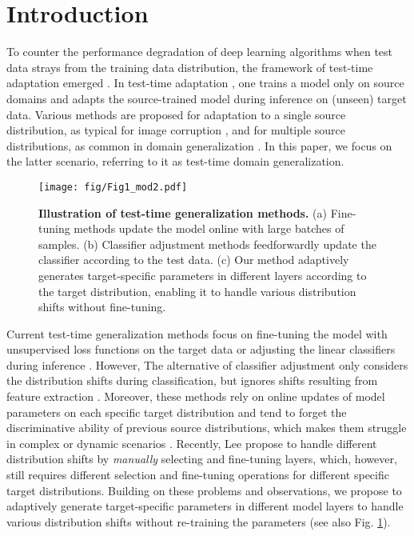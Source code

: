 \section{Introduction}

To counter the performance degradation of deep learning algorithms when test data strays from the training data distribution, the framework of test-time adaptation emerged \cite{wang2021tent, iwasawa2021test, zhang2023adanpc}. In test-time adaptation \cite{xiao2024beyond}, one trains a model only on source domains and adapts the source-trained model during inference on (unseen) target data. Various methods are proposed for adaptation to a single source distribution, as typical for image corruption \cite{sun2020test, wang2021tent, lim2023ttn}, and for multiple source distributions, as common in domain generalization \cite{iwasawa2021test, xiao2022learning, zhang2023adanpc}. In this paper, we focus on the latter scenario, referring to it as test-time domain generalization.


\begin{figure}[t!]
\centering
\texttt{[image: fig/Fig1\_mod2.pdf]}
\caption{\textbf{Illustration of test-time generalization methods.} (a) Fine-tuning methods update the model online with large batches of samples. 
(b) Classifier adjustment methods feedforwardly update the classifier according to the test data. 
(c) Our method adaptively generates target-specific parameters in different layers according to the target distribution, enabling it to handle various distribution shifts without fine-tuning. 
}
\label{fig1:all}
\vspace{-4mm}
\end{figure}

Current test-time generalization methods focus on fine-tuning the model with unsupervised loss functions on the target data \cite{wang2021tent,goyal2022test} or adjusting the linear classifiers during inference \cite{iwasawa2021test, zhang2023adanpc}. 
However, 
The alternative of classifier adjustment only considers the distribution shifts during classification, but ignores shifts resulting from feature extraction \cite{zhen_learning, lee2022surgical}. 
Moreover, these methods rely on online updates of model parameters on each specific target distribution and tend to forget the discriminative ability of previous source distributions, which makes them struggle in complex or dynamic scenarios \cite{yuan2023robust, zhang2023adanpc}.
Recently, Lee \etal \cite{lee2022surgical} propose to handle different distribution shifts by \emph{manually} selecting and fine-tuning layers, which, however, still requires different selection and fine-tuning operations for different specific target distributions.
Building on these problems and observations, we propose to adaptively generate target-specific parameters in different model layers to handle various distribution shifts without re-training the parameters (see also Fig. \ref{fig1:all}).


